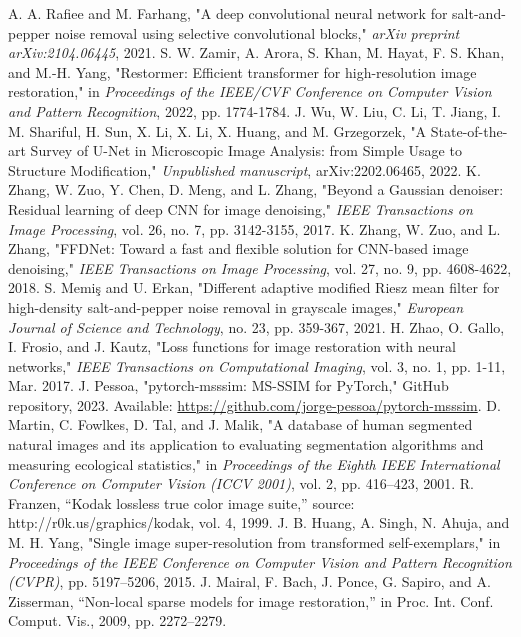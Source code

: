 \begin{thebibliography}{12}
     A. A. Rafiee and M. Farhang, "A deep convolutional neural network for salt-and-pepper noise removal using selective convolutional blocks," \textit{arXiv preprint arXiv:2104.06445}, 2021.
     S. W. Zamir, A. Arora, S. Khan, M. Hayat, F. S. Khan, and M.-H. Yang, "Restormer: Efficient transformer for high-resolution image restoration," in \textit{Proceedings of the IEEE/CVF Conference on Computer Vision and Pattern Recognition}, 2022, pp. 1774-1784.
     J. Wu, W. Liu, C. Li, T. Jiang, I. M. Shariful, H. Sun, X. Li, X. Li, X. Huang, and M. Grzegorzek, "A State-of-the-art Survey of U-Net in Microscopic Image Analysis: from Simple Usage to Structure Modification," \textit{Unpublished manuscript}, arXiv:2202.06465, 2022.
     K. Zhang, W. Zuo, Y. Chen, D. Meng, and L. Zhang, "Beyond a Gaussian denoiser: Residual learning of deep CNN for image denoising," \textit{IEEE Transactions on Image Processing}, vol. 26, no. 7, pp. 3142-3155, 2017.
     K. Zhang, W. Zuo, and L. Zhang, "FFDNet: Toward a fast and flexible solution for CNN-based image denoising," \textit{IEEE Transactions on Image Processing}, vol. 27, no. 9, pp. 4608-4622, 2018.
     S. Memiş and U. Erkan, "Different adaptive modified Riesz mean filter for high-density salt-and-pepper noise removal in grayscale images," \textit{European Journal of Science and Technology}, no. 23, pp. 359-367, 2021.
     H. Zhao, O. Gallo, I. Frosio, and J. Kautz, "Loss functions for image restoration with neural networks," \textit{IEEE Transactions on Computational Imaging}, vol. 3, no. 1, pp. 1-11, Mar. 2017.
     J. Pessoa, "pytorch-msssim: MS-SSIM for PyTorch," GitHub repository, 2023. Available: \url{https://github.com/jorge-pessoa/pytorch-msssim}.
     D. Martin, C. Fowlkes, D. Tal, and J. Malik, "A database of human segmented natural images and its application to evaluating segmentation algorithms and measuring ecological statistics," in \textit{Proceedings of the Eighth IEEE International Conference on Computer Vision (ICCV 2001)}, vol. 2, pp. 416–423, 2001.
     R. Franzen, “Kodak lossless true color image suite,” source: http://r0k.us/graphics/kodak, vol. 4, 1999.
     J. B. Huang, A. Singh, N. Ahuja, and M. H. Yang, "Single image super-resolution from transformed self-exemplars," in \textit{Proceedings of the IEEE Conference on Computer Vision and Pattern Recognition (CVPR)}, pp. 5197–5206, 2015.
     J. Mairal, F. Bach, J. Ponce, G. Sapiro, and A. Zisserman, “Non-local sparse models for image restoration,” in Proc. Int. Conf. Comput. Vis., 2009, pp. 2272–2279.
\end{thebibliography}